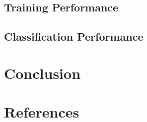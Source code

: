 \documentclass{report}
\begin{document}
\section{Training Performance}


\section{Classification Performance}


\chapter{Conclusion}


\chapter{References}

\printbibliography
\end{document}
